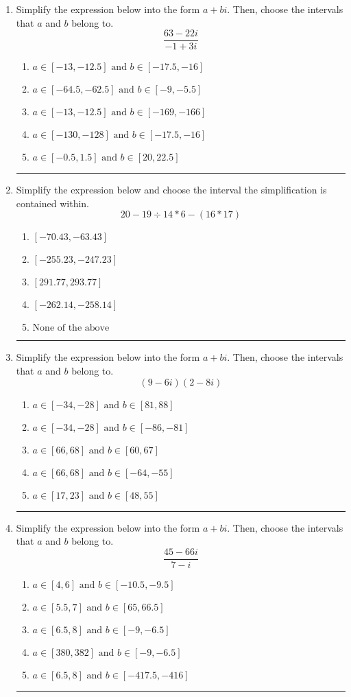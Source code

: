 \documentclass[14pt]{extbook}
\newcommand{\litem}[1]{\item#1\hspace*{-1cm}\rule{\textwidth}{0.4pt}}
\begin{document}
\begin{enumerate}
{\begin{enumerate}[label=\Alph*.]
\end{enumerate} }
\litem{
Simplify the expression below into the form $a+bi$. Then, choose the intervals that $a$ and $b$ belong to.\[ \frac{63 - 22 i}{-1 + 3 i} \]\begin{enumerate}[label=\Alph*.]
\item \( a \in [-13, -12.5] \text{ and } b \in [-17.5, -16] \)
\item \( a \in [-64.5, -62.5] \text{ and } b \in [-9, -5.5] \)
\item \( a \in [-13, -12.5] \text{ and } b \in [-169, -166] \)
\item \( a \in [-130, -128] \text{ and } b \in [-17.5, -16] \)
\item \( a \in [-0.5, 1.5] \text{ and } b \in [20, 22.5] \)

\end{enumerate} }
\litem{
Simplify the expression below and choose the interval the simplification is contained within.\[ 20 - 19 \div 14 * 6 - (16 * 17) \]\begin{enumerate}[label=\Alph*.]
\item \( [-70.43, -63.43] \)
\item \( [-255.23, -247.23] \)
\item \( [291.77, 293.77] \)
\item \( [-262.14, -258.14] \)
\item \( \text{None of the above} \)

\end{enumerate} }
\litem{
Simplify the expression below into the form $a+bi$. Then, choose the intervals that $a$ and $b$ belong to.\[ (9 - 6 i)(2 - 8 i) \]\begin{enumerate}[label=\Alph*.]
\item \( a \in [-34, -28] \text{ and } b \in [81, 88] \)
\item \( a \in [-34, -28] \text{ and } b \in [-86, -81] \)
\item \( a \in [66, 68] \text{ and } b \in [60, 67] \)
\item \( a \in [66, 68] \text{ and } b \in [-64, -55] \)
\item \( a \in [17, 23] \text{ and } b \in [48, 55] \)

\end{enumerate} }
\litem{
Simplify the expression below into the form $a+bi$. Then, choose the intervals that $a$ and $b$ belong to.\[ \frac{45 - 66 i}{7 - i} \]\begin{enumerate}[label=\Alph*.]
\item \( a \in [4, 6] \text{ and } b \in [-10.5, -9.5] \)
\item \( a \in [5.5, 7] \text{ and } b \in [65, 66.5] \)
\item \( a \in [6.5, 8] \text{ and } b \in [-9, -6.5] \)
\item \( a \in [380, 382] \text{ and } b \in [-9, -6.5] \)
\item \( a \in [6.5, 8] \text{ and } b \in [-417.5, -416] \)


\end{enumerate}}
\end{enumerate}
\end{document}

